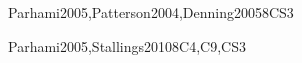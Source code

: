 \begin{syllabus}
\begin{unit}{\ARMemorysystemorganizationandarchitecture}{}{Parhami2005,Patterson2004,Denning2005}{8}{CS3}
\begin{topics}
  \item \ARMemorysystemorganizationandarchitectureTopicStorage
  \item \ARMemorysystemorganizationandarchitectureTopicMemory
  \item \ARMemorysystemorganizationandarchitectureTopicMain
  \item \ARMemorysystemorganizationandarchitectureTopicLatency
  \item \ARMemorysystemorganizationandarchitectureTopicCache
  \item \ARMemorysystemorganizationandarchitectureTopicMultiprocessor
  \item \ARMemorysystemorganizationandarchitectureTopicVirtual
  \item \ARMemorysystemorganizationandarchitectureTopicFault
  \item \ARMemorysystemorganizationandarchitectureTopicError
\end{topics}

\begin{learningoutcomes}
  \item \ARMemorysystemorganizationandarchitectureLOIdentify [\Familiarity]
  \item \ARMemorysystemorganizationandarchitectureLOExplainTheMemory [\Familiarity]
  \item \ARMemorysystemorganizationandarchitectureLODescribeHowOf [\Usage]
  \item \ARMemorysystemorganizationandarchitectureLODescribeTheMemory [\Usage] 
  \item \ARMemorysystemorganizationandarchitectureLOExplainTheA [\Usage] 
  \item \ARMemorysystemorganizationandarchitectureLOCompute [\Assessment]
\end{learningoutcomes}
\end{unit}

\begin{unit}{\ARInterfacingandcommunication}{}{Parhami2005,Stallings2010}{8}{C4,C9,CS3}
\begin{topics}
	\item \ARInterfacingandcommunicationTopicI
	\item \ARInterfacingandcommunicationTopicInterrupt
	\item \ARInterfacingandcommunicationTopicExternal
	\item \ARInterfacingandcommunicationTopicBuses
	\item \ARInterfacingandcommunicationTopicIntroduction
	\item \ARInterfacingandcommunicationTopicMultimedia
	\item \ARInterfacingandcommunicationTopicRaid
 \end{topics}
 

\end{unit}
\end{syllabus}
